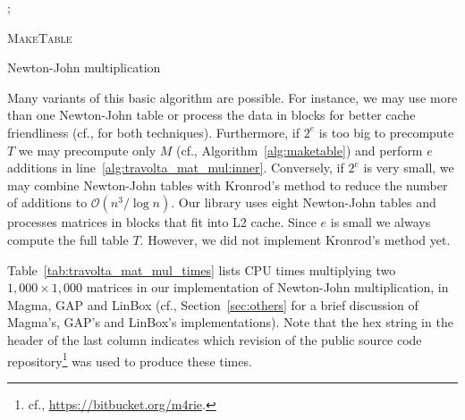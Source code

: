 \documentclass{sig-alternate}
\newcommand{\ord}[1]{\ensuremath{\mathcal{O}\!\left(#1\right)}}
\begin{document}
\begin{algorithm}[h]
;
\caption{\textsc{MakeTable}}
\label{alg:maketable}
\end{algorithm}

\begin{algorithm}[h]
\caption{Newton-John multiplication}
\label{alg:travolta_mat_mul}
\end{algorithm}

Many variants of this basic algorithm are possible. For instance, we may use more than one Newton-John table or process the data in blocks for better cache friendliness (cf., \cite{matmulgf2} for both techniques). Furthermore, if $2^e$ is too big to precompute $T$ we may precompute only $M$ (cf., Algorithm~\ref{alg:maketable}) and perform $e$ additions in line~\ref{alg:travolta_mat_mul:inner}. Conversely, if $2^e$ is very small, we may combine Newton-John tables with Kronrod's method to reduce the number of additions to $\ord{n^3/\log{n}}$.
Our library uses eight Newton-John tables and processes matrices in blocks that fit into L2 cache. Since $e$ is small we always compute the full table $T$. However, we did not implement Kronrod's method yet.

Table~\ref{tab:travolta_mat_mul_times} lists CPU times multiplying two $1,000 \times 1,000$ matrices in our implementation of Newton-John multiplication, in Magma, GAP and LinBox (cf., Section~\ref{sec:others} for a brief discussion of Magma's, GAP's and LinBox's implementations). Note that the hex string in the header of the last column indicates which revision of the public source code repository\footnote{cf., \url{https://bitbucket.org/m4rie}.} was used to produce these times.
\end{document}
